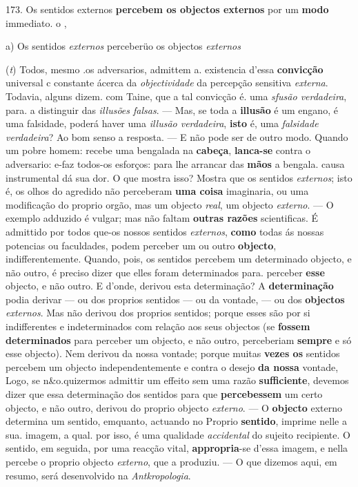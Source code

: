 173. Os sentidos externos \textbf{percebem os objectos externos} por um \textbf{modo} immediato. o ,

a) Os sentidos \emph{externos} perceberüo os objectos \emph{externos}

(\emph{t}) Todos, mesmo .os adversarios, admittem a. existencia d'essa \textbf{convicção} universal c constante ácerca da \emph{objectividade} da percepção sensitiva \emph{externa}. Todavia, alguns dizem. com Taine, que a tal convicção é. uma \emph{sfusão verdadeira}, para. a distinguir das \emph{illusões falsas}. --- Mas, se toda a \textbf{illusão} é um engano, é uma falsidade, poderá haver uma \emph{illusão verdadeira}, \textbf{isto} é, uma \emph{falsidade verdadeira}? Ao bom senso a resposta. --- E não pode ser de outro modo. Quando um pobre homem: recebe uma bengalada na \textbf{cabeça}, \textbf{lanca-se} contra o adversario: e-faz todos-os esforços: para lhe arrancar das \textbf{mãos} a bengala. causa instrumental dá sua dor. O que mostra isso? Mostra que os sentidos \emph{externos}; isto é, os olhos do agredido não perceberam \textbf{uma coisa} imaginaria, ou uma modificação do proprio orgão, mas um objecto \emph{real}, um objecto \emph{externo}. --- O exemplo adduzido é vulgar; mas não faltam \textbf{outras razões} scientificas. É admittido por todos que-os nossos sentidos \emph{externos}, \textbf{como} todas ás nossas potencias ou faculdades, podem perceber um ou outro \textbf{objecto}, indifferentemente. Quando, pois, os sentidos percebem um determinado objecto, e não outro, é preciso dizer que elles foram determinados para. perceber \textbf{esse} objecto, e não outro. E d'onde, derivou esta determinação? A \textbf{determinação} podia derivar --- ou dos proprios sentidos --- ou da vontade, --- ou dos \textbf{objectos} \emph{externos}. Mas não derivou dos proprios sentidos; porque esses são por si indifferentes e indeterminados com relação aos seus objectos (se \textbf{fossem determinados} para perceber um objecto, e não outro, perceberiam \textbf{sempre} e só esse objecto). Nem derivou da nossa vontade; porque muitas \textbf{vezes os} sentidos percebem um objecto independentemente e contra o desejo \textbf{da nossa} vontade, Logo, se n\&o.quizermos admittir um effeito sem uma razão \textbf{sufficiente}, devemos dizer que essa determinação dos sentidos para que \textbf{percebessem} um certo objecto, e não outro, derivou do proprio objecto \emph{externo}. --- O \textbf{objecto} externo determina um sentido, emquanto, actuando no Proprio \textbf{sentido}, imprime nelle a sua. imagem, a qual. por isso, é uma qualidade \emph{accidental} do sujeito recipiente. O sentido, em seguida, por uma reacção vital, \textbf{appropria}-se d'essa imagem, e nella percebe o proprio objecto \emph{externo}, que a produziu. --- O que dizemos aqui, em resumo, será desenvolvido na \emph{Antkropologia}.

